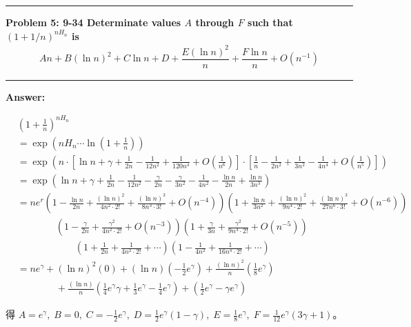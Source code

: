 \documentclass[11pt,fleqn]{article}
\newcommand\question[2]{\vspace{.25in}\hrule\textbf{#1: #2}\vspace{.5em}\hrule\vspace{.10in}}
\renewcommand\part[1]{\vspace{.10in}\textbf{#1}}
\begin{document}
\question{Problem 5} {9-34 Determinate values $A$ through $F$ such that $(1+1/n)^{n H_n}$ 
	is
	\begin{align*}
		An + B(\ln n)^2 + C \ln n + D + \dfrac{E(\ln n)^2}{n} + \dfrac{F \ln n}{n} + O(n^{-1})
	\end{align*}
}

\part{Answer:}

\begin{align*}
	& \left(1 + \frac{1}{n} \right)^{n H_n} \\
		&= \exp\left(n H_n \cdots \ln\left( 1 + \frac{1}{n} \right) \right) \\
		&= \exp\left(n \cdot 
			\left[ \ln n + \gamma + \frac{1}{2n} - \frac{1}{12n^2} + \frac{1}{120n^4} + O(\frac{1}{n^6}) \right] \cdot 
			\left[ \frac{1}{n} - \frac{1}{2n^2} + \frac{1}{3n^2} - \frac{1}{4n^4} + O(\frac{1}{n^5}) \right]
			\right) \\
		&= \exp\left( \ln n + \gamma + \frac{1}{2n} - \frac{1}{12n^2} 
				- \frac{\gamma}{2n} - \frac{\gamma}{3n^2} - \frac{1}{4n^2}
				- \frac{\ln n}{2n} + \frac{\ln n}{3n^3} \right) \\
		&= n e^r \left(1 - \frac{\ln n}{2n} + \frac{(\ln n)^2}{4n^2\cdot 2!}
					+ \frac{(\ln n)^3}{8n^3\cdot 3!} + O(n^{-4}) \right)
			\left(1 + \frac{\ln n}{3n^2} + \frac{(\ln n)^2}{9n^4\cdot 2!}
					+ \frac{(\ln n)^3}{27n^6\cdot 3!} + O(n^{-6}) \right) \\
		&	\qquad \qquad 
			\left(1 - \frac{\gamma}{2n} + \frac{\gamma^2}{4n^2\cdot 2!} + O(n^{-3}) \right) 
			\left(1 + \frac{\gamma}{3n} + \frac{\gamma^2}{9n^4\cdot 2!} + O(n^{-5}) \right) \\
		&	\qquad \qquad \qquad 
			\left(1 + \frac{1}{2n} + \frac{1}{4n^2 \cdot 2!} + \cdots \right)
			\left(1 - \frac{1}{4n^2} + \frac{1}{16n^4 \cdot 2!} + \cdots \right) \\
		&= ne^\gamma + \left(\ln n\right)^2 (0) + 
			\left(\ln n\right) \left(-\frac{1}{2}e^\gamma\right) 
			+ \frac{\left(\ln n\right)^2}{n} \left(\frac{1}{8} e^\gamma\right) \\
		&	\qquad \qquad
			+ \frac{\left(\ln n\right)}{n} 
				\left(\frac{1}{4} e^\gamma \gamma + \frac{1}{3} e^\gamma 
				- \frac{1}{4} e^\gamma\right)
			+ \left(\frac{1}{2} e^\gamma - \gamma e^\gamma \right)
\end{align*}

得 $A = e^\gamma, \; B = 0, \; C = -\frac{1}{2} e^\gamma, \; D = \frac{1}{2} e^\gamma(1-\gamma), \; E = \frac{1}{8} e^\gamma, \; F = \frac{1}{12} e^\gamma (3 \gamma + 1)$。
\end{document}
